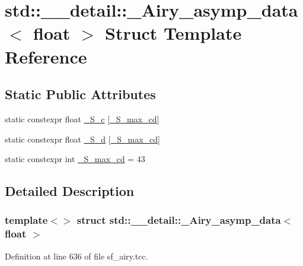 \hypertarget{structstd_1_1____detail_1_1__Airy__asymp__data_3_01float_01_4}{}\section{std\+:\+:\+\_\+\+\_\+detail\+:\+:\+\_\+\+Airy\+\_\+asymp\+\_\+data$<$ float $>$ Struct Template Reference}
\label{structstd_1_1____detail_1_1__Airy__asymp__data_3_01float_01_4}
\subsection*{Static Public Attributes}
\begin{DoxyCompactItemize}
\item 
static constexpr float \hyperlink{structstd_1_1____detail_1_1__Airy__asymp__data_3_01float_01_4_a8fc68acdbcbc59f4ecfdd4bc2f4f2a1e}{\+\_\+\+S\+\_\+c} \mbox{[}\hyperlink{structstd_1_1____detail_1_1__Airy__asymp__data_3_01float_01_4_ac0e59b83a90623587f20cdc32a9e7565}{\+\_\+\+S\+\_\+max\+\_\+cd}\mbox{]}
\item 
static constexpr float \hyperlink{structstd_1_1____detail_1_1__Airy__asymp__data_3_01float_01_4_ad947443d5860fcd25d25ad6d04ea3bb3}{\+\_\+\+S\+\_\+d} \mbox{[}\hyperlink{structstd_1_1____detail_1_1__Airy__asymp__data_3_01float_01_4_ac0e59b83a90623587f20cdc32a9e7565}{\+\_\+\+S\+\_\+max\+\_\+cd}\mbox{]}
\item 
static constexpr int \hyperlink{structstd_1_1____detail_1_1__Airy__asymp__data_3_01float_01_4_ac0e59b83a90623587f20cdc32a9e7565}{\+\_\+\+S\+\_\+max\+\_\+cd} = 43
\end{DoxyCompactItemize}


\subsection{Detailed Description}
\subsubsection*{template$<$$>$\newline
struct std\+::\+\_\+\+\_\+detail\+::\+\_\+\+Airy\+\_\+asymp\+\_\+data$<$ float $>$}



Definition at line 636 of file sf\+\_\+airy.\+tcc.



